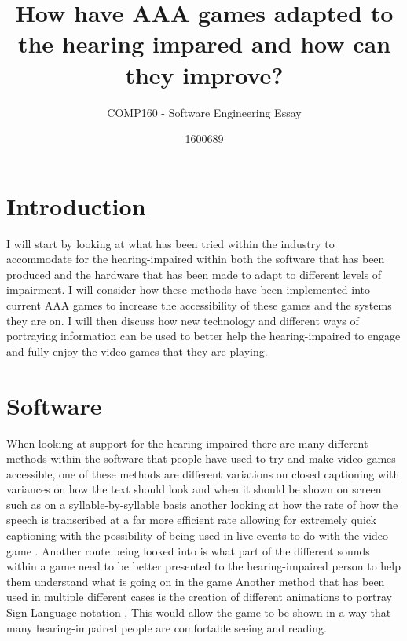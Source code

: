 \documentclass{scrartcl}
\title{How have AAA games adapted to the hearing impared and how can they improve?}
\subtitle{COMP160 - Software Engineering Essay}
\author{1600689}
\begin{document}
\maketitle


\section{Introduction}

I will start by looking at what has been tried within the industry to accommodate for the hearing-impaired within both the software that has been produced and the hardware that has been made to adapt to different levels of impairment. I will consider how these methods have been implemented into current AAA games to increase the accessibility of these games and the systems they are on. I will then discuss how new technology and different ways of portraying information can be used to better help the hearing-impaired to engage and fully enjoy the video games that they are playing.

\section{Software}

When looking at support for the hearing impaired there are many different methods within the software that people have used to try and make video games accessible, one of these methods are different variations on closed captioning with variances on how the text should look and when it should be shown on screen \cite{Coutinho} such as on a syllable-by-syllable basis \cite{Sargent} another looking at how the rate of how the speech is transcribed at a far more efficient rate allowing for extremely quick captioning with the possibility of being used in live events to do with the video game \cite{Lasecki}. Another route being looked into is what part of the different sounds within a game need to be better presented to the hearing-impaired person to help them understand what is going on in the game \cite{Hiraga}
Another method that has been used in multiple different cases is the creation of different animations to portray Sign Language notation \cite{Bouzid} \cite{Namatame}, This would allow the game to be shown in a way that many hearing-impaired people are comfortable seeing and reading.
\end{document}
